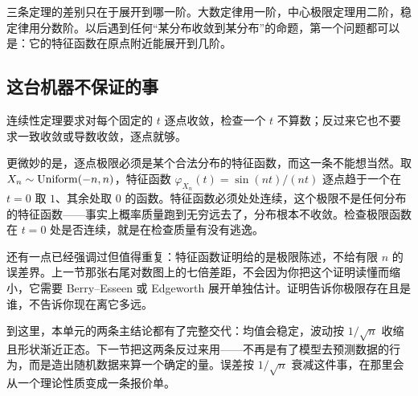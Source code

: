 三条定理的差别只在于展开到哪一阶。大数定律用一阶，中心极限定理用二阶，稳定律用分数阶。以后遇到任何``某分布收敛到某分布''的命题，第一个问题都可以是：它的特征函数在原点附近能展开到几阶。

\subsection{这台机器不保证的事}

连续性定理要求对每个固定的 \(t\) 逐点收敛，检查一个 \(t\) 不算数；反过来它也不要求一致收敛或导数收敛，逐点就够。

更微妙的是，逐点极限必须是某个合法分布的特征函数，而这一条不能想当然。取 \(X_n\sim\operatorname{Uniform}(-n,n)\)，特征函数 \(\varphi_{X_n}(t)=\sin(nt)/(nt)\) 逐点趋于一个在 \(t=0\) 取 \(1\)、其余处取 \(0\) 的函数。特征函数必须处处连续，这个极限不是任何分布的特征函数——事实上概率质量跑到无穷远去了，分布根本不收敛。检查极限函数在 \(t=0\) 处是否连续，就是在检查质量有没有逃逸。

还有一点已经强调过但值得重复：特征函数证明给的是极限陈述，不给有限 \(n\) 的误差界。上一节那张右尾对数图上的七倍差距，不会因为你把这个证明读懂而缩小，它需要 Berry--Esseen 或 Edgeworth 展开单独估计。证明告诉你极限存在且是谁，不告诉你现在离它多远。

到这里，本单元的两条主结论都有了完整交代：均值会稳定，波动按 \(1/\sqrt n\) 收缩且形状渐近正态。下一节把这两条反过来用——不再是有了模型去预测数据的行为，而是造出随机数据来算一个确定的量。误差按 \(1/\sqrt n\) 衰减这件事，在那里会从一个理论性质变成一条报价单。
